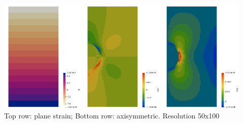 \begin{center}
\includegraphics[width=4cm]{python_codes/fieldstone_91/results/axi/press}
\includegraphics[width=4cm]{python_codes/fieldstone_91/results/axi/exx}
\includegraphics[width=4cm]{python_codes/fieldstone_91/results/axi/exy}\\
{\captionfont Top row: plane strain; Bottom row: axisymmetric. Resolution 50x100}
\end{center}



